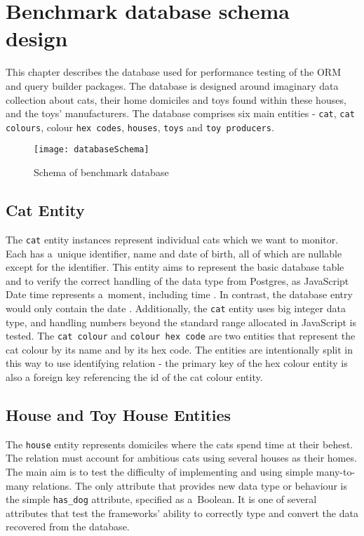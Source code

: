 \chapter{Benchmark database schema design}\label{ch:database}

This chapter describes the database used for performance testing of the ORM and
query builder packages. The database is designed around imaginary data
collection about cats, their home domiciles and toys found within these houses,
and the toys' manufacturers. The database comprises six main entities -
\texttt{cat}, \texttt{cat colours}, colour \texttt{hex codes}, \texttt{houses},
\texttt{toys} and \texttt{toy producers}.

\begin{figure}[b]
    \centering
    \texttt{[image: databaseSchema]}
    \caption{Schema of benchmark database}
\end{figure}

\section{Cat Entity}
The \texttt{cat} entity instances represent individual cats which we want to
monitor. Each has a~unique identifier, name and date of birth, all of which are
nullable except for the identifier. This entity aims to represent the basic
database table and to verify the correct handling of the data type from
Postgres, as JavaScript Date time represents a~moment, including time
\cite{JavaScript-Date-MDN}. In contrast, the database entry would only contain
the date \cite{Date/TimeTypes_Postgres}. Additionally, the \texttt{cat} entity
uses big integer data type, and handling numbers beyond the standard range
allocated in JavaScript is tested. The \texttt{cat colour} and \texttt{colour
hex code} are two entities that represent the cat colour by its name and by its
hex code. The entities are intentionally split in this way to use identifying
relation \cite{Karwin_2010} - the primary key of the hex colour entity is also a
foreign key referencing the id of the cat colour entity.

\section{House and Toy House Entities}
The \texttt{house} entity represents domiciles where the cats spend time at
their behest. The relation must account for ambitious cats using several houses
as their homes. The main aim is to test the difficulty of implementing and using
simple many-to-many relations. The only attribute that provides new data type or
behaviour is the simple \verb|has_dog| attribute, specified as a~Boolean. It is
one of several attributes that test the frameworks' ability to correctly type
and convert the data recovered from the database.

